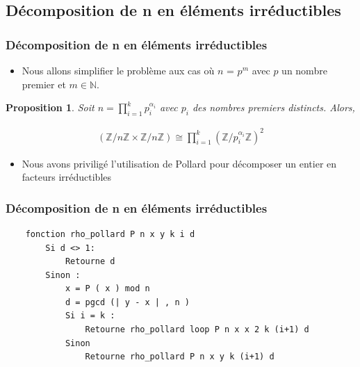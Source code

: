 \documentclass{beamer}
\newtheorem{prp}{Proposition}
\begin{document}
\subsection{Décomposition de n en éléments irréductibles}
\begin{frame}
    \frametitle{Décomposition de n en éléments irréductibles}
    
    \begin{itemize}
        \item Nous allons simplifier le problème aux cas où $n$ = $p ^ {m}$ avec $p$ un nombre premier et $m \in \mathbb{N}$.
    \end{itemize}
    
    \begin{prp}
        Soit $n = \prod\limits_{i = 1}^k p_i^{\alpha_i}$ avec $p_i$ des nombres premiers distincts. Alors,
    
        \begin{align*}
            (\mathbb{Z}/n\mathbb{Z} \times \mathbb{Z}/n\mathbb{Z})
            \cong
            \prod\limits_{i = 1}^k (\mathbb{Z}/p_i^{\alpha_i}\mathbb{Z})^{2}
        \end{align*}
    \end{prp}
\end{frame}

\begin{frame}[fragile]
    \begin{itemize}
        \item Nous avons priviligé l'utilisation de \rho Pollard pour décomposer un entier en facteurs irréductibles
    \end{itemize}
    \frametitle{Décomposition de n en éléments irréductibles}
    \begin{verbatim}
    fonction rho_pollard P n x y k i d
        Si d <> 1:
            Retourne d
        Sinon :
            x = P ( x ) mod n
            d = pgcd (| y - x | , n )
            Si i = k :
                Retourne rho_pollard loop P n x x 2 k (i+1) d
            Sinon 
                Retourne rho_pollard P n x y k (i+1) d
    \end{verbatim}
\end{frame}
\end{document}
